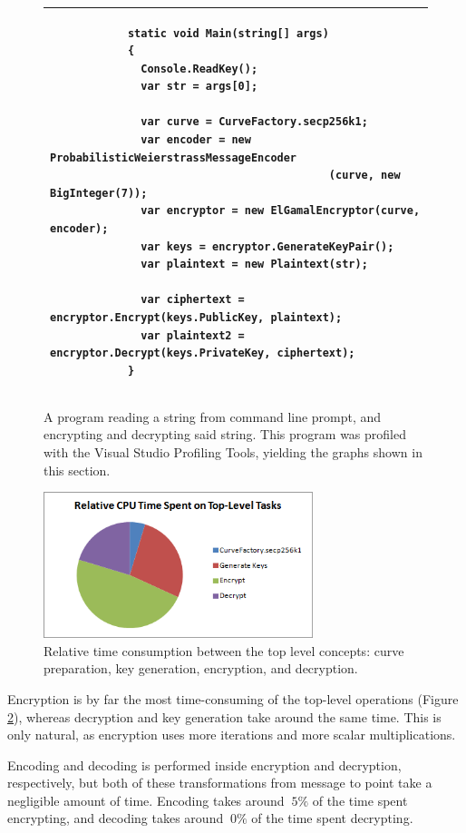 \begin{figure}[htb]
	\centering
	\begin{tabular}{|p{\textwidth}|}
		\hline
		\begin{verbatim}
			static void Main(string[] args)
			{
			  Console.ReadKey();
			  var str = args[0];

			  var curve = CurveFactory.secp256k1;
			  var encoder = new ProbabilisticWeierstrassMessageEncoder
			                               (curve, new BigInteger(7));
			  var encryptor = new ElGamalEncryptor(curve, encoder);
			  var keys = encryptor.GenerateKeyPair();
			  var plaintext = new Plaintext(str);
			  
			  var ciphertext = encryptor.Encrypt(keys.PublicKey, plaintext);
			  var plaintext2 = encryptor.Decrypt(keys.PrivateKey, ciphertext);
			}
		\end{verbatim}
		\\
		\hline
	\end{tabular}
	\caption{A program reading a string from command line prompt, and encrypting and decrypting said string. This program
		was profiled with the Visual Studio Profiling Tools, yielding the graphs shown in this section.}
	\label{fig:profiler-code}
\end{figure}

\begin{figure}[htb]
	\centering
	\includegraphics[width=0.70\textwidth]{performance/top-level--relative-time}
	\caption{Relative time consumption between the top level concepts: curve preparation, key generation, encryption, and decryption.}
	\label{fig:toplevel-performance}
\end{figure}

Encryption is by far the most time-consuming of the top-level operations (Figure \ref{fig:toplevel-performance}), whereas decryption and
key generation take around the same time. This is only natural, as encryption uses more iterations and more scalar multiplications.

Encoding and decoding is performed inside encryption and decryption, respectively, but both of these transformations from message to
point take a negligible amount of time. Encoding takes around \(~5\%\) of the time spent encrypting, and decoding takes around \(~0\%\)
of the time spent decrypting.

